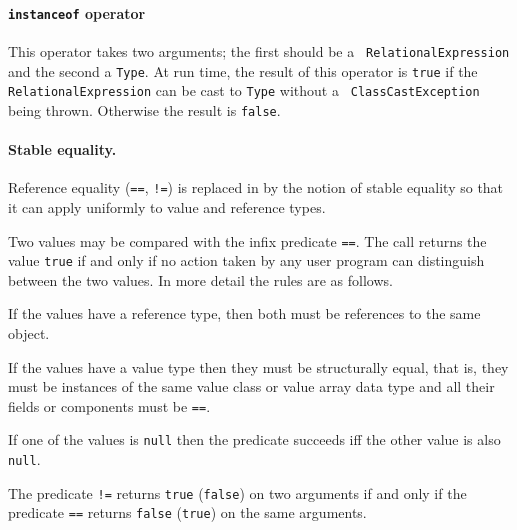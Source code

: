 \paragraph{{\tt instanceof} operator}\label{instanceOf}

This operator takes two arguments; the first should be a {\tt
RelationalExpression} and the second a {\tt Type}. At run time, the
result of this operator is {\tt true} if the {\tt
RelationalExpression} can be cast to {\tt Type} without a {\tt
ClassCastException} being thrown. Otherwise the result is {\tt false}.

\paragraph{Stable equality.}\label{StableEquality}\index{==}\index{!=}
Reference equality ({\tt ==}, {\tt !=}) is replaced in \Xten{} by the
notion of stable equality so that it can apply uniformly to value and
reference types.

Two values may be compared with the infix predicate {\tt ==}. The call
returns the value {\tt true} if and only if no action taken by any
user program can distinguish between the two values.  In more detail
the rules are as follows.

If the values have a reference type, then both must be references to
the same object. 

If the values have a value type then they must be structurally equal,
that is, they must be instances of the same value class or value array
data type and all their fields or components must be {\tt ==}. 

If one of the values is {\tt null} then the predicate succeeds iff the
other value is also {\tt null}.

The predicate {\tt !=} returns {\tt true} ({\tt false}) on two
arguments if and only if the predicate {\tt ==} returns {\tt false}
({\tt true}) on the same arguments.
